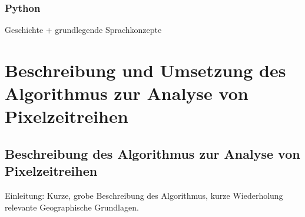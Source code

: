 \subsection{Python}
Geschichte + grundlegende Sprachkonzepte

\chapter[Algorithmus zur Analyse von Pixelzeitreihen]{Beschreibung und Umsetzung des Algorithmus zur Analyse von Pixelzeitreihen}
\section[Beschreibung des Algorithmus]{Beschreibung des Algorithmus zur Analyse von Pixelzeitreihen}

Einleitung: Kurze, grobe Beschreibung des Algorithmus, kurze Wiederholung relevante Geographische Grundlagen.

